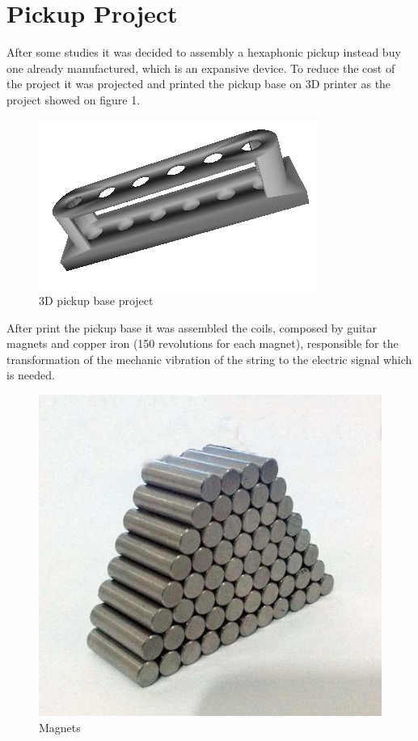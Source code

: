 \chapter{Pickup Project}
\label{pickup-project}

After some studies it was decided to assembly a hexaphonic pickup instead buy one
already manufactured, which is an expansive device. To reduce the cost of the
project it was projected and printed the pickup base on 3D printer as the
project showed on figure 1.

\begin{figure}[!htpb]
\centering
\caption{3D pickup base project}
\label{3D-project}
\includegraphics[scale=0.5]{images/Capt}
\end{figure}

After print the pickup base it was assembled the coils, composed by guitar magnets
and copper iron (150 revolutions for each magnet), responsible for the transformation
of the mechanic vibration of the string to the electric signal which is needed.

\begin{figure}[!htpb]
\centering
\includegraphics[scale=0.3]{images/ima}
\caption{Magnets}
\end{figure}

